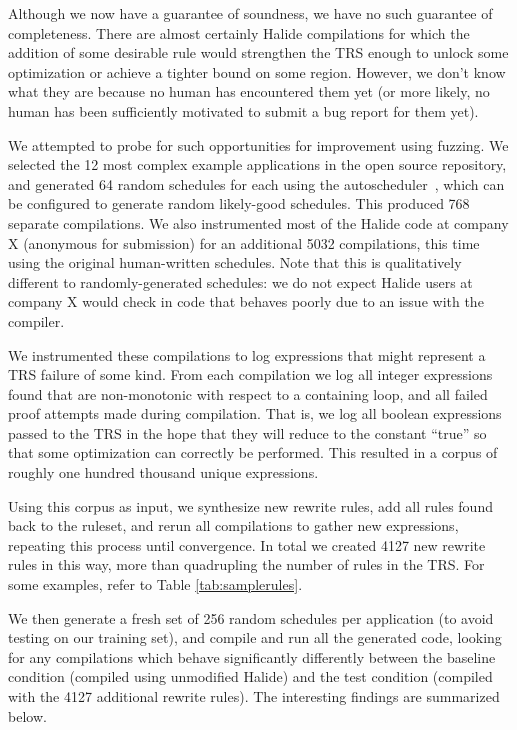 \documentclass[acmsmall,review,anonymous]{acmart}\settopmatter{printfolios=true,printccs=false,printacmref=false}
\begin{document}

Although we now have a guarantee of soundness, we have no such guarantee of completeness. There are almost certainly Halide compilations for which the addition of some desirable rule would strengthen the TRS enough to unlock some optimization or achieve a tighter bound on some region. However, we don’t know what they are because no human has encountered them yet (or more likely, no human has been sufficiently motivated to submit a bug report for them yet). 

We attempted to probe for such opportunities for improvement using fuzzing. We selected the 12 most complex example applications in the open source repository, and generated 64 random schedules for each using the autoscheduler~\cite{Adams2019}, which can be configured to generate random likely-good schedules. This produced 768 separate compilations. We also instrumented most of the Halide code at company X (anonymous for submission) for an additional 5032 compilations, this time using the original human-written schedules. Note that this is qualitatively different to randomly-generated schedules: we do not expect Halide users at company X would check in code that behaves poorly due to an issue with the compiler.

We instrumented these compilations to log expressions that might represent a TRS failure of some kind. From each compilation we log all integer expressions found that are non-monotonic with respect to a containing loop, and all failed proof attempts made during compilation. That is, we log all boolean expressions passed to the TRS in the hope that they will reduce to the constant “true” so that some optimization can correctly be performed. This resulted in a corpus of roughly one hundred thousand unique expressions.

Using this corpus as input, we synthesize new rewrite rules, add all rules found back to the ruleset, and rerun all compilations to gather new expressions, repeating this process until convergence. In total we created 4127 new rewrite rules in this way, more than quadrupling the number of rules in the TRS. For some examples, refer to Table \ref{tab:samplerules}.

We then generate a fresh set of 256 random schedules per application (to avoid testing on our training set), and compile and run all the generated code, looking for any compilations which behave significantly differently between the baseline condition (compiled using unmodified Halide) and the test condition (compiled with the 4127 additional rewrite rules). The interesting findings are summarized below.
\end{document}
